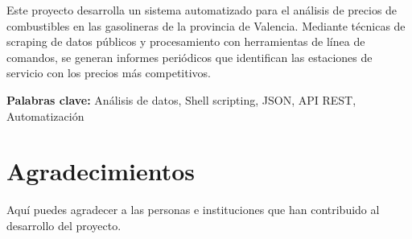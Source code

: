 Este proyecto desarrolla un sistema automatizado para el análisis de precios de combustibles en las gasolineras de la provincia de Valencia. Mediante técnicas de scraping de datos públicos y procesamiento con herramientas de línea de comandos, se generan informes periódicos que identifican las estaciones de servicio con los precios más competitivos.

\textbf{Palabras clave:} Análisis de datos, Shell scripting, JSON, API REST, Automatización

\chapter*{Agradecimientos}

Aquí puedes agradecer a las personas e instituciones que han contribuido al desarrollo del proyecto.
